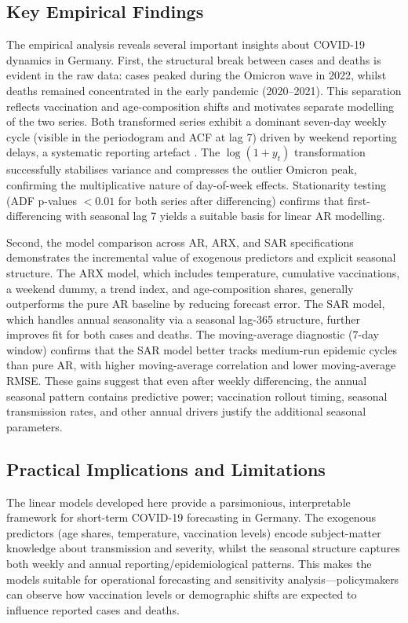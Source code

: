 ﻿\documentclass[12pt,a4paper]{article}
\begin{document}
\subsection*{Key Empirical Findings}

The empirical analysis reveals several important insights about COVID-19 dynamics in Germany. First, the structural break between cases and deaths is evident in the raw data: cases peaked during the Omicron wave in 2022, whilst deaths remained concentrated in the early pandemic (2020--2021). This separation reflects vaccination and age-composition shifts \citep{LopezBernal2021} and motivates separate modelling of the two series. Both transformed series exhibit a dominant seven-day weekly cycle (visible in the periodogram and ACF at lag 7) driven by weekend reporting delays, a systematic reporting artefact \citep{Bergman2020}. The $\log(1+y_t)$ transformation successfully stabilises variance and compresses the outlier Omicron peak, confirming the multiplicative nature of day-of-week effects. Stationarity testing (ADF p-values $<0.01$ for both series after differencing) confirms that first-differencing with seasonal lag 7 yields a suitable basis for linear AR modelling.

Second, the model comparison across AR, ARX, and SAR specifications demonstrates the incremental value of exogenous predictors and explicit seasonal structure. The ARX model, which includes temperature, cumulative vaccinations, a weekend dummy, a trend index, and age-composition shares, generally outperforms the pure AR baseline by reducing forecast error. The SAR model, which handles annual seasonality via a seasonal lag-365 structure, further improves fit for both cases and deaths. The moving-average diagnostic (7-day window) confirms that the SAR model better tracks medium-run epidemic cycles than pure AR, with higher moving-average correlation and lower moving-average RMSE. These gains suggest that even after weekly differencing, the annual seasonal pattern contains predictive power; vaccination rollout timing, seasonal transmission rates, and other annual drivers justify the additional seasonal parameters.

\subsection*{Practical Implications and Limitations}

The linear models developed here provide a parsimonious, interpretable framework for short-term COVID-19 forecasting in Germany. The exogenous predictors (age shares, temperature, vaccination levels) encode subject-matter knowledge about transmission and severity, whilst the seasonal structure captures both weekly and annual reporting/epidemiological patterns. This makes the models suitable for operational forecasting and sensitivity analysis---policymakers can observe how vaccination levels or demographic shifts are expected to influence reported cases and deaths.
\end{document}
